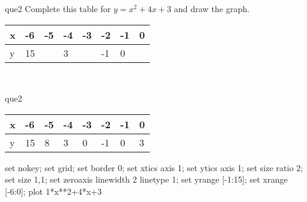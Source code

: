 \documentclass[13.5pt, varwidth=true]{beamer}
\begin{document}
\begin{frame}[shrink=19,fragile]
	\begin{beamercolorbox}[rounded=true, left, shadow=true,wd=14.8cm]{que2}
		 Complete this table for $y = x^{2} + 4x + 3$ and draw the graph. \\[0.3cm] \renewcommand{\arraystretch}{1.2}\begin{tabular}{|C|C|C|C|C|C|C|C|} \hline x & -6 & -5 & -4 & -3 & -2 & -1 & 0 \\ \hline y & 15 &  & 3 &  & -1 & 0 & \\ \hline \end{tabular}\\[0.3cm]
	\end{beamercolorbox}
\end{frame}
\begin{frame}[shrink=19,fragile]
	\begin{beamercolorbox}[rounded=true, left, shadow=true,wd=14.8cm]{que2}
		\renewcommand{\arraystretch}{1.2}\begin{tabular}{|C|C|C|C|C|C|C|C|} \hline x & -6 & -5 & -4 & -3 & -2 & -1 & 0 \\ \hline y & 15 & 8 & 3 & 0 & -1 & 0 & 3\\ \hline \end{tabular}\begin{gnuplot}[terminal=pdf] set nokey; set grid; set border 0; set xtics axis 1; set ytics axis 1; set size ratio 2; set size 1,1; set zeroaxis linewidth 2 linetype 1; set yrange [-1:15]; set xrange [-6:0]; plot 1*x**2+4*x+3 \end{gnuplot}
	\end{beamercolorbox}
\end{frame}
\end{document}
